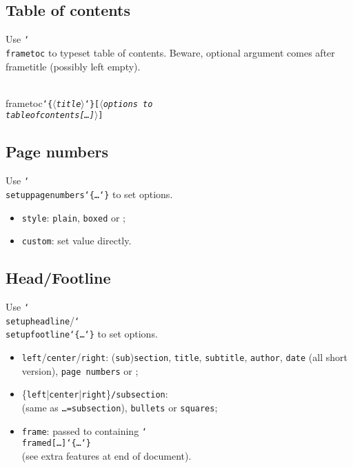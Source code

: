 \documentclass[utf8, a4paper]{beamer}
\newcommand*\cs[1]{\texttt{\char`\\#1}}
\newcommand*\meta[1]{\ensuremath{\langle}{\em#1}\ensuremath{\rangle}}
\newcommand*\marg[1]{\texttt{\char`\{#1\char`\}}}
\newcommand*\oarg[1]{\texttt{[#1]}}
\let\type\texttt
\newcommand*\default[1]{\underbar{#1}}
\begin{document}

\subsection{Table of contents}

\begin{frame}[fragile]

  Use \cs{frametoc} to typeset table of contents. \alert{Beware},
  optional argument comes \alert{after} frametitle (possibly left
  empty).
\begin{semiverbatim}
\\frametoc\marg{\meta{title}}\oarg{\meta{options to \\tableofcontents\oarg{…}}}
\end{semiverbatim}

\end{frame}


\subsection{Page numbers}

\begin{frame}[fragile]

  Use \cs{setuppagenumbers}\marg{…} to set options.
  \begin{itemize}
  \item \type{style}: \type{plain}, \type{boxed} or
    \type{\default{none}};
  \item \type{custom}: set value directly.
  \end{itemize}

\end{frame}


\subsection{Head/Footline}

\begin{frame}

  Use \cs{setupheadline}/\cs{setupfootline}\marg{…} to set options.
  \begin{itemize}
  \item \type{left}/\type{center}/\type{right}:
    (\type{sub})\type{section}, \type{title}, \type{subtitle},
    \type{author}, \type{date} (all short version), \type{page~numbers}
    or \type{\default{empty}};
  \item \{\type{left}|\type{center}|\type{right}\}\type{/subsection}:\\
    \type{\default{text}} (same as \type{…=subsection}), \type{bullets}
    or \type{squares};
  \item \type{frame}: passed to containing \cs{framed}\oarg{…}\marg{…}\\
    (see extra features at end of document).
  \end{itemize}

\end{frame}
\end{document}
